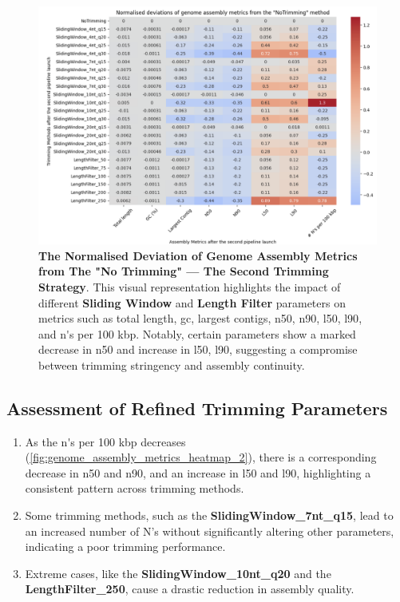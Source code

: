 \begin{figure}[H]
\centering
\includegraphics[width=\linewidth]{resources/images/genome_assembly_metrics_heatmap_2.png}
\caption{\textbf{The Normalised Deviation of Genome Assembly Metrics from The "No Trimming" — The Second Trimming Strategy}. This visual representation highlights the impact of different \textbf{Sliding Window} and \textbf{Length Filter} parameters on \gls{metrics} such as \gls{total length}, \gls{gc}, \gls{largest contigs}, \gls{n50}, \gls{n90}, \gls{l50}, \gls{l90}, and \gls{n's per 100 kbp}. Notably, certain parameters show a marked decrease in \gls{n50} and increase in \gls{l50}, \gls{l90}, suggesting a compromise between \gls{trimming} stringency and \gls{assembly} continuity.}
\label{fig:genome_assembly_metrics_heatmap_2}
\end{figure}



\subsection{Assessment of Refined Trimming Parameters}

\begin{enumerate}
  \item As the \gls{n's per 100 kbp} decreases (\autoref{fig:genome_assembly_metrics_heatmap_2}), there is a corresponding decrease in \gls{n50} and \gls{n90}, and an increase in \gls{l50} and \gls{l90}, highlighting a consistent pattern across \gls{trimming} methods.
  \item Some \gls{trimming} methods, such as the \textbf{SlidingWindow\_7nt\_q15}, lead to an increased number of N's without significantly altering other parameters, indicating a poor \gls{trimming} performance.
  \item Extreme cases, like the \textbf{SlidingWindow\_10nt\_q20} and the \textbf{LengthFilter\_250}, cause a drastic reduction in \gls{assembly} quality.
\end{enumerate}

